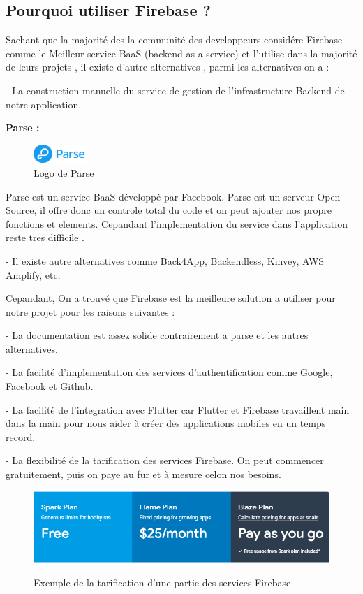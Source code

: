 \subsection{Pourquoi utiliser Firebase ?}
Sachant que la majorité des la communité des developpeurs considére Firebase comme le Meilleur 
service BaaS (backend as a service) et l'utilise dans la majorité de leurs projets , il existe 
d'autre alternatives , parmi les alternatives on a : 

- La construction manuelle du service de gestion de l'infrastructure Backend de notre application.

\textbf{Parse :}\medskip
\begin{figure}
    \vspace{-15pt}
    \includegraphics[width=2cm]{images/Chapitre2/parse_logo.png}
    \vspace{-20pt}
    \caption{{\footnotesize Logo de Parse}}
\end{figure}
Parse est un service BaaS développé par Facebook. Parse
est un serveur Open Source, il offre donc un controle total
du code et on peut ajouter nos propre fonctions et elements. Cepandant 
l'implementation du service dans l'application reste tres difficile .

- Il existe autre alternatives comme Back4App, Backendless,
Kinvey, AWS Amplify, etc.


Cepandant, On a trouvé que Firebase est la meilleure solution a utiliser
pour notre projet pour les raisons suivantes : 

- La documentation est assez solide contrairement a parse et les autres alternatives.

- La facilité d'implementation des services d'authentification comme Google, Facebook et Github.

- La facilité de l'integration avec Flutter car Flutter et Firebase travaillent main dans la main
 pour nous aider à créer des applications mobiles en un temps record.

- La flexibilité de la tarification des services Firebase. On peut commencer gratuitement,
puis on paye au fur et à mesure celon nos besoins.~\cite{FirebasePricing}
\begin{figure}[!h]

    \centering
    \includegraphics[width=6in]{images/Chapitre2/firebase_pricing_offers.PNG}
    \label{fig:firebasepricing}
    \caption{Exemple de la tarification d'une partie des services Firebase}
\end{figure}

